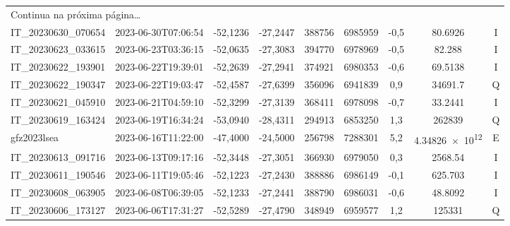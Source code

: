 \begin{center}
\begin{longtable}{lcccccccc}
\endhead

\multicolumn{3}{l}{\footnotesize{Continua na próxima página\ldots}}}\\
\endfoot
\hline

\endlastfoot
IT\_20230630\_070654 & 2023-06-30T07:06:54 & -52,1236 & -27,2447 & 388756 & 6985959 & -0,5 & \num[round-precision=3,round-mode=figures,scientific-notation=true]{80.6926} & I \\
IT\_20230623\_033615 & 2023-06-23T03:36:15 & -52,0635 & -27,3083 & 394770 & 6978969 & -0,5 & \num[round-precision=3,round-mode=figures,scientific-notation=true]{82.288} & I \\
IT\_20230622\_193901 & 2023-06-22T19:39:01 & -52,2639 & -27,2941 & 374921 & 6980353 & -0,6 & \num[round-precision=3,round-mode=figures,scientific-notation=true]{69.5138} & I \\
IT\_20230622\_190347 & 2023-06-22T19:03:47 & -52,4587 & -27,6399 & 356096 & 6941839 & 0,9 & \num[round-precision=3,round-mode=figures,scientific-notation=true]{34691.7} & Q \\
IT\_20230621\_045910 & 2023-06-21T04:59:10 & -52,3299 & -27,3139 & 368411 & 6978098 & -0,7 & \num[round-precision=3,round-mode=figures,scientific-notation=true]{33.2441} & I \\
IT\_20230619\_163424 & 2023-06-19T16:34:24 & -53,0940 & -28,4311 & 294913 & 6853250 & 1,3 & \num[round-precision=3,round-mode=figures,scientific-notation=true]{262839} & Q \\
gfz2023lsea & 2023-06-16T11:22:00 & -47,4000 & -24,5000 & 256798 & 7288301 & 5,2 & \num[round-precision=3,round-mode=figures,scientific-notation=true]{4.34826e+12} & E \\
IT\_20230613\_091716 & 2023-06-13T09:17:16 & -52,3448 & -27,3051 & 366930 & 6979050 & 0,3 & \num[round-precision=3,round-mode=figures,scientific-notation=true]{2568.54} & I \\
IT\_20230611\_190546 & 2023-06-11T19:05:46 & -52,1223 & -27,2430 & 388886 & 6986149 & -0,1 & \num[round-precision=3,round-mode=figures,scientific-notation=true]{625.703} & I \\
IT\_20230608\_063905 & 2023-06-08T06:39:05 & -52,1233 & -27,2441 & 388790 & 6986031 & -0,6 & \num[round-precision=3,round-mode=figures,scientific-notation=true]{48.8092} & I \\
IT\_20230606\_173127 & 2023-06-06T17:31:27 & -52,5289 & -27,4790 & 348949 & 6959577 & 1,2 & \num[round-precision=3,round-mode=figures,scientific-notation=true]{125331} & Q \\

\end{longtable}
\end{center}
